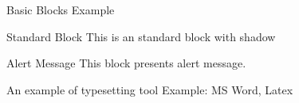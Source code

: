 \documentclass{ctexbeamer}
\begin{document}
\begin{frame}{Basic Blocks Example}

\begin{block}{Standard Block}
  This is an standard block with shadow
\end{block}

\begin{alertblock}{Alert Message}
  This block presents alert message.
\end{alertblock}

\begin{exampleblock}{An example of typesetting tool}
  Example: MS Word, Latex
\end{exampleblock}

\end{frame}
\end{document}
